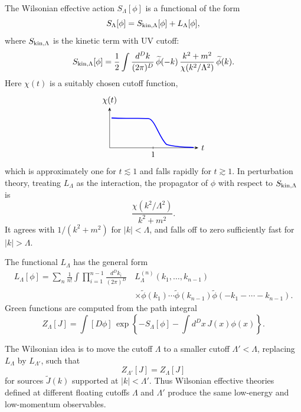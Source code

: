 The Wilsonian effective action \(S_\Lambda[\phi]\) is a functional of the
form
\[
  S_\Lambda[\phi]
  =
  S_{{\rm kin},\Lambda}[\phi]+L_\Lambda[\phi],
\]
where \(S_{{\rm kin},\Lambda}\) is the kinetic term with UV cutoff:
\[
  S_{{\rm kin},\Lambda}[\phi]
  =
  \frac12\int\frac{d^Dk}{(2\pi)^D}\,
  \widetilde\phi(-k)\,
  \frac{k^2+m^2}{\chi(k^2/\Lambda^2)}\,
  \widetilde\phi(k).
\]
Here \(\chi(t)\) is a suitably chosen cutoff function,
\[
\begin{tikzpicture}[>=Stealth,scale=0.82,baseline=(current bounding box.center)]
  \draw[->] (0,0)--(4.6,0) node[right] {\(t\)};
  \draw[->] (0,0)--(0,2.1) node[above] {\(\chi(t)\)};
  \draw[blue,line width=1.1pt]
    (0.1,1.55) .. controls (.8,1.5) and (1.5,1.56) .. (2.0,1.52)
    .. controls (2.35,1.48) and (2.55,.55) .. (2.95,.17)
    .. controls (3.45,.02) and (3.95,.03) .. (4.35,.02);
  \draw (2.25,0.06)--(2.25,-0.06) node[below] {\(1\)};
\end{tikzpicture}
\]
which is approximately one for \(t\lesssim1\) and falls rapidly for
\(t\gtrsim1\).  In perturbation theory, treating \(L_\Lambda\) as the
interaction, the propagator of \(\phi\) with respect to
\(S_{{\rm kin},\Lambda}\) is
\[
  \frac{\chi(k^2/\Lambda^2)}{k^2+m^2}.
\]
It agrees with \(1/(k^2+m^2)\) for \(|k|<\Lambda\), and falls off to zero
sufficiently fast for \(|k|>\Lambda\).

The functional \(L_\Lambda\) has the general form
\[
\begin{aligned}
  L_\Lambda[\phi]
  =
  \sum_n\frac{1}{n!}
  \int\prod_{i=1}^{n-1}\frac{d^Dk_i}{(2\pi)^D}\,
  &L_\Lambda^{(n)}(k_1,\ldots,k_{n-1})
\\[-.25em]
  &\times
  \widetilde\phi(k_1)\cdots\widetilde\phi(k_{n-1})
  \widetilde\phi(-k_1-\cdots-k_{n-1}) .
\end{aligned}
\]
Green functions are computed from the path integral
\[
  Z_\Lambda[J]
  =
  \int [D\phi]\,
  \exp\left\{
    -S_\Lambda[\phi]-\int d^Dx\,J(x)\phi(x)
  \right\}.
\]

The Wilsonian idea is to move the cutoff \(\Lambda\) to a smaller cutoff
\(\Lambda'<\Lambda\), replacing \(L_\Lambda\) by \(L_{\Lambda'}\), such that
\[
  Z_{\Lambda'}[J]=Z_\Lambda[J]
\]
for sources \(\widetilde J(k)\) supported at \(|k|<\Lambda'\).  Thus
Wilsonian effective theories defined at different floating cutoffs
\(\Lambda\) and \(\Lambda'\) produce the same low-energy and low-momentum
observables.

